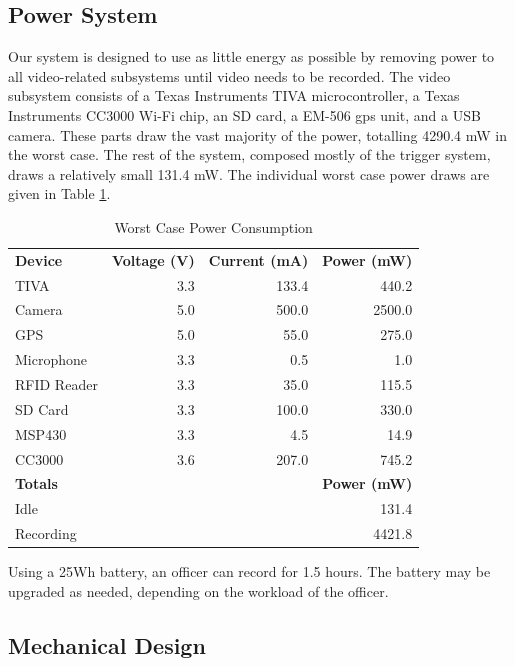 \documentclass[12pt]{article}
\begin{document}
\subsection{Power System}
Our system is designed to use as little energy as possible by removing power to
all video-related subsystems until video needs to be recorded. The video
subsystem consists of a Texas Instruments TIVA
microcontroller\cite[p.~1880]{tm4c1294ncpdt}, a Texas Instruments CC3000 Wi-Fi
chip\cite[p.~6]{cc3000}, an SD card\cite[p.~19,23]{sd_standard}, a EM-506 \gls{gps}
unit\cite[p.~10]{em506}, and a USB camera\cite[p.~245]{usb_standard}. These
parts draw the vast majority of the power, totalling 4290.4 mW in the worst case.
The rest of the system, composed mostly of the trigger system, draws a relatively small 131.4 mW. The individual worst
case power draws are given in Table \ref{tab:worst_case_power}.

\begin{table}[h!]
    \centering
    \caption{Worst Case Power Consumption}
    \begin{tabular}{lrrr}
        \textbf{Device} & \textbf{Voltage (V)} & \textbf{Current (mA)} & \textbf{Power (mW)}\\
        TIVA & 3.3 & 133.4 & 440.2\\
        Camera & 5.0 & 500.0 & 2500.0\\
        GPS & 5.0 & 55.0 & 275.0\\
        Microphone & 3.3 & 0.5 & 1.0\\
        RFID Reader & 3.3 & 35.0 & 115.5\\
        SD Card & 3.3 & 100.0 & 330.0\\
        MSP430 & 3.3 & 4.5 & 14.9\\
        CC3000 & 3.6 & 207.0 & 745.2\\
        \hline
        \textbf{Totals} & & & \textbf{Power (mW)}\\
        Idle & & & 131.4\\
        Recording & & & 4421.8\\
    \end{tabular}
    \label{tab:worst_case_power}
\end{table}

Using a 25Wh battery, an officer can record for 1.5 hours. The battery may be
upgraded as needed, depending on the workload of the officer.

\subsection{Mechanical Design}
\end{document}
